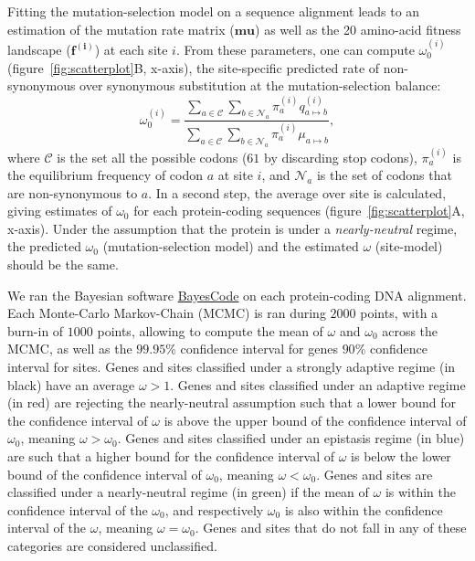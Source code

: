 \documentclass{article}
\newcommand{\UniDimArray}[1]{\bm{#1}}
\begin{document}
Fitting the mutation-selection model on a sequence alignment leads to an estimation of the mutation rate matrix ($\UniDimArray{mu}$) as well as the 20 amino-acid fitness landscape ($\UniDimArray{f^{(i)}}$) at each site $i$.
From these parameters, one can compute $\omega_{0}^{(i)}$ (figure~\ref{fig:scatterplot}B, x-axis), the site-specific predicted rate of non-synonymous over synonymous substitution at the mutation-selection balance:
\begin{equation}
	\omega_{0}^{(i)} = \dfrac{\sum_{a \in \mathcal{C}} \sum_{b \in \mathcal{N}_a} \pi_a^{(i)} q_{a \mapsto b}^{(i)}}{\sum_{a \in \mathcal{C}} \sum_{b \in \mathcal{N}_a} \pi_a^{(i)} \mu_{a \mapsto b}},
\end{equation}
where $\mathcal{C}$ is the set all the possible codons ($61$ by discarding stop codons), $\pi_a^{(i)}$ is the equilibrium frequency of codon $a$ at site $i$, and $\mathcal{N}_a$ is the set of codons that are non-synonymous to $a$\cite{spielman_relationship_2015, rodrigue_detecting_2016}.
In a second step, the average over site is calculated, giving estimates of $\omega_{0}$ for each protein-coding sequences (figure~\ref{fig:scatterplot}A, x-axis).
Under the assumption that the protein is under a \textit{nearly-neutral} regime, the predicted $\omega_{0}$ (mutation-selection model) and the estimated $\omega$ (site-model) should be the same\cite{spielman_relationship_2015}.

We ran the Bayesian software \href{https://github.com/bayesiancook/bayescode}{BayesCode} on each protein-coding DNA alignment\cite{lartillot_phylobayes_2013, rodrigue_detecting_2016}.
Each Monte-Carlo Markov-Chain (MCMC) is ran during $2000$ points, with a burn-in of $1000$ points, allowing to compute the mean of $\omega$ and $\omega_{0}$ across the MCMC, as well as the $99.95$\% confidence interval for genes $90$\% confidence interval for sites.
Genes and sites classified under a strongly adaptive regime (in black) have an average $\omega > 1$.
Genes and sites classified under an adaptive regime (in red) are rejecting the nearly-neutral assumption such that a lower bound for the confidence interval of $\omega$ is above the upper bound of the confidence interval of $\omega_{0}$, meaning $\omega > \omega_{0}$.
Genes and sites classified under an epistasis regime (in blue) are such that a higher bound for the confidence interval of $\omega$ is below the lower bound of the confidence interval of $\omega_{0}$, meaning $\omega < \omega_{0}$.
Genes and sites are classified under a nearly-neutral regime (in green) if the mean of $\omega$ is within the confidence interval of the $\omega_{0}$, and respectively $\omega_{0}$ is also within the confidence interval of the $\omega$, meaning $\omega = \omega_{0}$.
Genes and sites that do not fall in any of these categories are considered unclassified.
\end{document}

